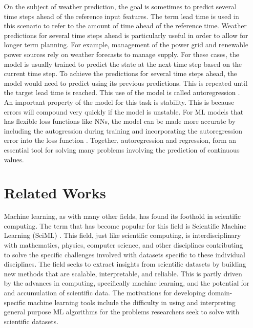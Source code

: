 On the subject of weather prediction, the goal is sometimes to predict several time steps ahead of the reference input features. The term lead time is used in this scenario to refer to the amount of time ahead of the reference time. Weather predictions for several time steps ahead is particularly useful in order to allow for longer term planning. For example, management of the power grid and renewable power sources rely on weather forecasts to manage supply. For these cases, the model is usually trained to predict the state at the next time step based on the current time step. To achieve the predictions for several time steps ahead, the model would need to predict using its previous predictions. This is repeated until the target lead time is reached. This use of the model is called autoregression \autocite{maccarroneGDPForecastingMachine2021}. An important property of the model for this task is stability. This is because errors will compound very quickly if the model is unstable. For ML models that has flexible loss functions like NNs, the model can be made more accurate by including the autogression during training and incorporating the autoregression error into the loss function \autocite{pmlr-v32-gregor14}. Together, autoregression and regression, form an essential tool for solving many problems involving the prediction of continuous values.

\section{Related Works}
\noindent Machine learning, as with many other fields, has found its foothold in scientific computing. The term that has become popular for this field is Scientific Machine Learning (SciML) \autocite{bakerWorkshopReportBasic2019}. This field, just like scientific computing, is interdisciplinary with mathematics, physics, computer science, and other disciplines contributing to solve the specific challenges involved with datasets specific to these individual disciplines. The field seeks to extract insights from scientific datasets by building new methods that are scalable, interpretable, and reliable. This is partly driven by the advances in computing, specifically machine learning, and the potential for and accumulation of scientific data. The motivations for developing domain-specific machine learning tools include the difficulty in using and interpreting general purpose ML algorithms for the problems researchers seek to solve with scientific datasets.

